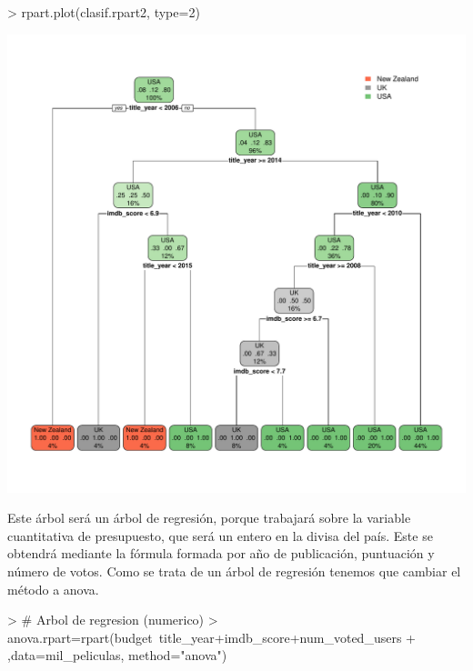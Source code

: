 \documentclass[a4paper]{article}
\begin{document}
\begin{Schunk}
\begin{Sinput}
> rpart.plot(clasif.rpart2, type=2)
\end{Sinput}
\end{Schunk}
\includegraphics{practica-3-rpart2}

Este árbol será un árbol de regresión, porque trabajará sobre la variable cuantitativa de presupuesto, que será un entero en la divisa del país. Este se obtendrá mediante la fórmula formada por año de publicación, puntuación y número de votos. Como se trata de un árbol de regresión tenemos que cambiar el método a anova.

\begin{Schunk}
\begin{Sinput}
> # Arbol de regresion (numerico)
> anova.rpart=rpart(budget~title_year+imdb_score+num_voted_users
+                   ,data=mil_peliculas, method="anova")
\end{Sinput}
\end{Schunk}
\end{document}
